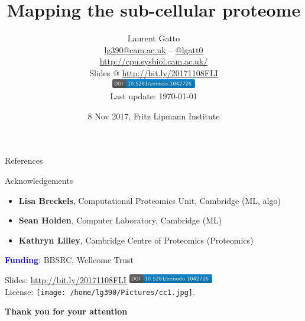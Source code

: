 \documentclass[presentation]{beamer}
\date{8 Nov 2017, Fritz Lipmann Institute}
\title{
  \textbf{Mapping the sub-cellular proteome}
}
\author{Laurent Gatto\\
  \url{lg390@cam.ac.uk} -- \url{@lgatt0}\\
  \url{http://cpu.sysbiol.cam.ac.uk/}\\
  \bigskip
  Slides @ \url{http://bit.ly/20171108FLI}\\
  \includegraphics[height=4mm]{zenodo-1042726.png}\\
  \tiny{Last update: \today}
}
\begin{document}
\maketitle









\begin{frame}[allowframebreaks]{References}
  \footnotesize
  
  
\end{frame}


\begin{frame}
  \begin{block}{Acknowledgements}
    \begin{itemize}
    \item \textbf{Lisa Breckels}, Computational Proteomics Unit, Cambridge (ML, algo)
    \item \textbf{Sean Holden}, Computer Laboratory, Cambridge (ML)
    \item \textbf{Kathryn Lilley}, Cambridge Centre of Proteomics (Proteomics)
    \end{itemize}
  \end{block}

  \textcolor{Blue}{\textbf{Funding}}: BBSRC, Wellcome Trust

  \bigskip

  {\footnotesize Slides: \url{http://bit.ly/20171108FLI} 
    \includegraphics[height=4mm]{zenodo-1042726.png} \\
    License: \texttt{[image: /home/lg390/Pictures/cc1.jpg]}.}

  \begin{center}
    \textbf{Thank you for your attention}
  \end{center}

\end{frame}
\end{document}
